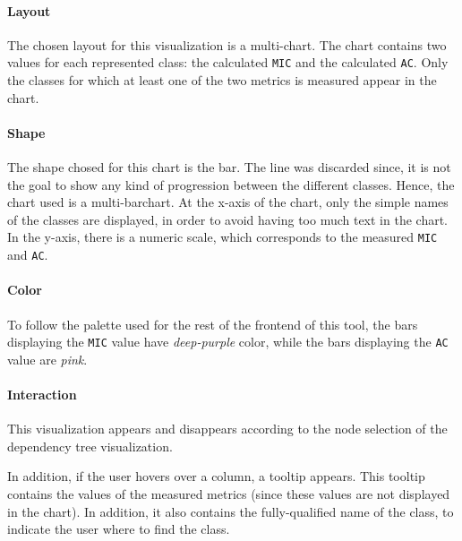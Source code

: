 \paragraph{Layout}
The chosen layout for this visualization is a multi-chart. The chart contains two values for each represented class: the calculated \texttt{MIC} and the calculated \texttt{AC}. Only the classes for which at least one of the two metrics is measured appear in the chart. 

\paragraph{Shape}
The shape chosed for this chart is the bar. The line was discarded since, it is not the goal to show any kind of progression between the different classes. Hence, the chart used is a multi-barchart.
At the x-axis of the chart, only the simple names of the classes are displayed, in order to avoid having too much text in the chart. In the y-axis, there is a numeric scale, which corresponds to the measured \texttt{MIC} and \texttt{AC}.

\paragraph{Color}
To follow the palette used for the rest of the frontend of this tool, the bars displaying the \texttt{MIC} value have \textit{deep-purple} color, while the bars displaying the \texttt{AC} value are \textit{pink}.

\paragraph{Interaction}
This visualization appears and disappears according to the node selection of the dependency tree visualization.

In addition, if the user hovers over a column, a tooltip appears. This tooltip contains the values of the measured metrics (since these values are not displayed in the chart). In addition, it also contains the fully-qualified name of the class, to indicate the user where to find the class.
